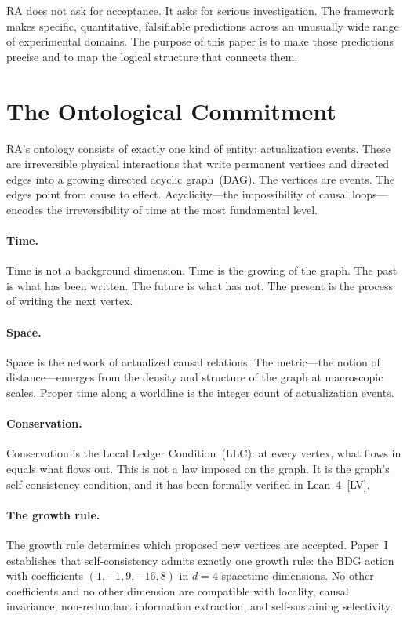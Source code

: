 \documentclass[11pt,a4paper]{article}
\theoremstyle{plain}
\theoremstyle{definition}
\theoremstyle{remark}
\begin{document}
RA does not ask for acceptance.  It asks for serious investigation.  The
framework makes specific, quantitative, falsifiable predictions across an
unusually wide range of experimental domains.  The purpose of this paper is to
make those predictions precise and to map the logical structure that connects
them.

\section{The Ontological Commitment}\label{sec:ontology}

RA's ontology consists of exactly one kind of entity: actualization events.
These are irreversible physical interactions that write permanent vertices and
directed edges into a growing directed acyclic graph~(DAG).  The vertices are
events.  The edges point from cause to effect.  Acyclicity---the impossibility
of causal loops---encodes the irreversibility of time at the most fundamental
level.

\paragraph{Time.}
Time is not a background dimension.  Time is the growing of the graph.  The past
is what has been written.  The future is what has not.  The present is the
process of writing the next vertex.

\paragraph{Space.}
Space is the network of actualized causal relations.  The metric---the notion of
distance---emerges from the density and structure of the graph at macroscopic
scales.  Proper time along a worldline is the integer count of actualization
events.

\paragraph{Conservation.}
Conservation is the Local Ledger Condition~(LLC): at every vertex, what flows in
equals what flows out.  This is not a law imposed on the graph.  It is the
graph's self-consistency condition, and it has been formally verified in
Lean~4~[LV].

\paragraph{The growth rule.}
The growth rule determines which proposed new vertices are accepted.  Paper~I
establishes that self-consistency admits exactly one growth rule: the BDG action
with coefficients $(1,-1,9,-16,8)$ in $d=4$ spacetime dimensions.  No other
coefficients and no other dimension are compatible with locality, causal
invariance, non-redundant information extraction, and self-sustaining
selectivity.
\end{document}
